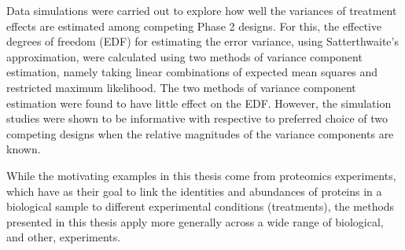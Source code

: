 Data simulations were carried out to explore how well the variances of treatment effects are estimated among competing Phase 2 designs. For this, the effective degrees of freedom (EDF) for estimating the error variance, using Satterthwaite's approximation, were calculated using two methods of variance component estimation, namely taking linear combinations of expected mean squares and restricted maximum likelihood. The two methods of variance component estimation were found to have little effect on the EDF. However, the simulation studies were shown to be informative with respective to preferred choice of two competing designs when the relative magnitudes of the variance components are known.  

While the motivating examples in this thesis come from proteomics experiments, which have as their goal to link the identities and abundances of proteins in a biological sample to different experimental conditions (treatments), the methods presented in this thesis apply more generally across a wide range of biological, and other, experiments.  

